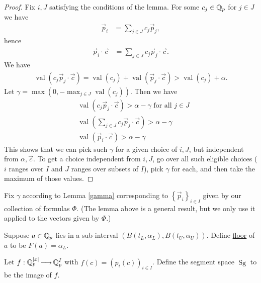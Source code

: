 \documentclass{amsart}
\newcommand{\curly}[1]{\left\{#1\right\}}
\newcommand{\paren}[1]{\left(#1\right)}
\DeclareMathOperator{\Sg}{Sg}
\DeclareMathOperator{\val}{val}
\newcommand{\defn}{\underline}
\begin{document}
\begin{proof}
  Fix $i, J$ satisfying the conditions of the lemma.
  For some $c_j \in \mathbb{Q}_p$ for $j \in J$ we have
  \begin{align*}
    \vec p_i &= \sum_{j \in J} c_j \vec p_j,
  \end{align*}
  hence
  \begin{align*}
    \vec p_i \cdot \vec c &= \sum_{j \in J} c_j \vec p_j \cdot \vec c.
  \end{align*}
  We have
  \begin{align*}
    \val \paren{c_j \vec p_j \cdot \vec c} = \val \paren{c_j} + \val \paren{\vec p_j \cdot \vec c} > \val \paren{c_j} + \alpha.
  \end{align*}
  Let $\gamma = \max(0, -\max_{j \in J} \val \paren{c_j})$.
  Then we have 
  \begin{align*}
    &\val \paren{c_j \vec p_j \cdot \vec c} > \alpha - \gamma \text{ for all $j \in J$}\\
    &\val \paren{\sum_{j \in J} c_j \vec p_j \cdot \vec c} > \alpha - \gamma \\
    &\val(\vec p_i \cdot \vec c) > \alpha - \gamma
  \end{align*}
  This shows that we can pick such $\gamma$ for a given choice of $i, J$, but independent from $\alpha, \vec c$.
  To get a choice independent from $i, J$, go over all such eligible choices 
  ($i$ ranges over $I$ and $J$ ranges over subsets of $I$),
  pick $\gamma$ for each, and then take the maximum of those values.
\end{proof}

Fix $\gamma$ according to Lemma \ref{gamma} corresponding to $\curly{\vec p_i}_{i \in I}$ given by our collection of formulas $\Phi$.
(The lemma above is a general result, but we only use it applied to the vectors given by $\Phi$.)

\begin{Definition}
  Suppose $a \in \mathbb{Q}_p$ lies in a sub-interval $\paren{B(t_L, \alpha_L),  B(t_U, \alpha_U)}$.
  Define \defn{floor} of $a$ to be $F(a) = \alpha_L$.
\end{Definition}

\begin{Definition}
  Let $f: \mathbb{Q}_p^{|x|} \operatorname{\longrightarrow} \mathbb{Q}_p^I$ with $f(c) = (p_i(c))_{i \in I}$.
  Define the segment space $\Sg$ to be the image of $f$.	
\end{Definition}
\end{document}
